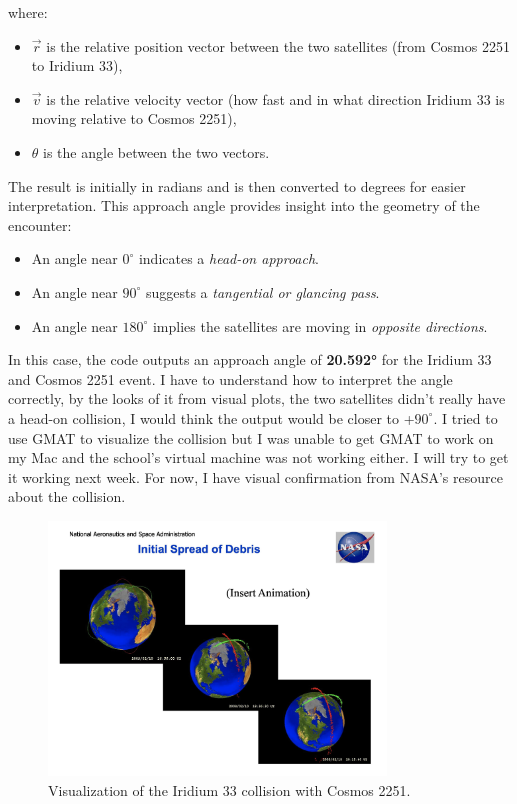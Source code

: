 \documentclass[12pt]{report}
\begin{document}
\begin{enumerate}
  where:
  \begin{itemize}
    \item $\vec{r}$ is the relative position vector between the two satellites (from Cosmos 2251 to Iridium 33),
    \item $\vec{v}$ is the relative velocity vector (how fast and in what direction Iridium 33 is moving relative to Cosmos 2251),
    \item $\theta$ is the angle between the two vectors.
  \end{itemize}

  The result is initially in radians and is then converted to degrees for easier interpretation.
  \newline\newline
  This approach angle provides insight into the geometry of the encounter:
  \begin{itemize}
    \item An angle near $0^\circ$ indicates a \textit{head-on approach}.
    \item An angle near $90^\circ$ suggests a \textit{tangential or glancing pass}.
    \item An angle near $180^\circ$ implies the satellites are moving in \textit{opposite directions}.
  \end{itemize}

  In this case, the code outputs an approach angle of \textbf{20.592°} for the Iridium 33 and Cosmos 2251 event.
  I have to understand how to interpret the angle correctly, by the looks of it from visual plots, the two satellites didn't really have a head-on collision, I would think the output would be closer to +$90^\circ$.
  \newline\newline
  I tried to use GMAT to visualize the collision but I was unable to get GMAT to work on my Mac and the school's virtual machine was not working either. I will try to get it working next week.
  For now, I have visual confirmation from NASA's resource about the collision.

  \begin{figure}[H]
    \centering
    \includegraphics[width=0.8\textwidth]{figure_week_4_collision.png}
    \caption{Visualization of the Iridium 33 collision with Cosmos 2251.}
    \label{fig:collision_visualization}
  \end{figure}


\end{enumerate}
\end{document}
